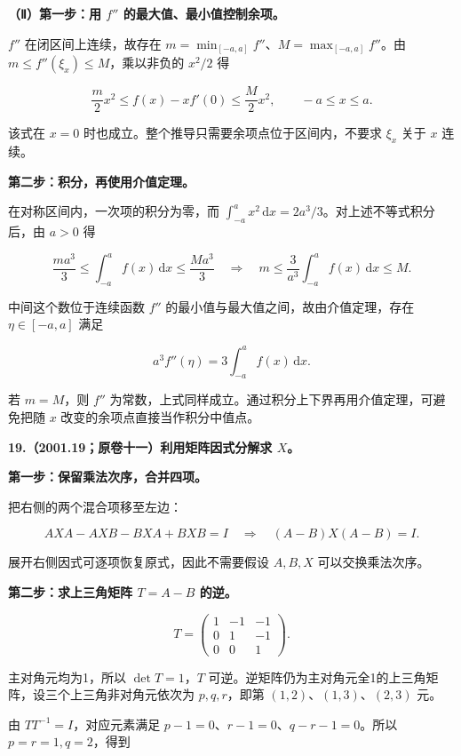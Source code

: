 \documentclass[UTF8,11pt,fontset=windows]{ctexart}
\begin{document}
\textbf{（Ⅱ）第一步：用 $f''$ 的最大值、最小值控制余项。}

$f''$ 在闭区间上连续，故存在 $m=\min_{[-a,a]}f''$、$M=\max_{[-a,a]}f''$。由 $m\le f''(\xi_x)\le M$，乘以非负的 $x^2/2$ 得

$$
\frac m2x^2\le f(x)-xf'(0)\le\frac M2x^2,
\qquad -a\le x\le a.
$$

该式在 $x=0$ 时也成立。整个推导只需要余项点位于区间内，不要求 $\xi_x$ 关于 $x$ 连续。

\textbf{第二步：积分，再使用介值定理。}

在对称区间内，一次项的积分为零，而 $\int_{-a}^a x^2\,\mathrm dx=2a^3/3$。对上述不等式积分后，由 $a>0$ 得

$$
\frac{ma^3}{3}\le\int_{-a}^a f(x)\,\mathrm dx\le\frac{Ma^3}{3}
\quad\Longrightarrow\quad
m\le\frac3{a^3}\int_{-a}^a f(x)\,\mathrm dx\le M.
$$

中间这个数位于连续函数 $f''$ 的最小值与最大值之间，故由介值定理，存在 $\eta\in[-a,a]$ 满足

$$
\boxed{a^3 f''(\eta)=3\int_{-a}^a f(x)\,\mathrm dx}.
$$

若 $m=M$，则 $f''$ 为常数，上式同样成立。通过积分上下界再用介值定理，可避免把随 $x$ 改变的余项点直接当作积分中值点。

\clearpage

\textbf{19.（2001.19；原卷十一）利用矩阵因式分解求 $X$。}

\textbf{第一步：保留乘法次序，合并四项。}

把右侧的两个混合项移至左边：

$$
AXA-AXB-BXA+BXB=I
\quad\Longrightarrow\quad (A-B)X(A-B)=I.
$$

展开右侧因式可逐项恢复原式，因此不需要假设 $A,B,X$ 可以交换乘法次序。

\textbf{第二步：求上三角矩阵 $T=A-B$ 的逆。}

$$
T=\begin{pmatrix}1&-1&-1\\0&1&-1\\0&0&1\end{pmatrix}.
$$

主对角元均为1，所以 $\det T=1$，$T$ 可逆。逆矩阵仍为主对角元全1的上三角矩阵，设三个上三角非对角元依次为 $p,q,r$，即第 $(1,2)$、$(1,3)$、$(2,3)$ 元。

由 $TT^{-1}=I$，对应元素满足 $p-1=0$、$r-1=0$、$q-r-1=0$。所以 $p=r=1,q=2$，得到
\end{document}
